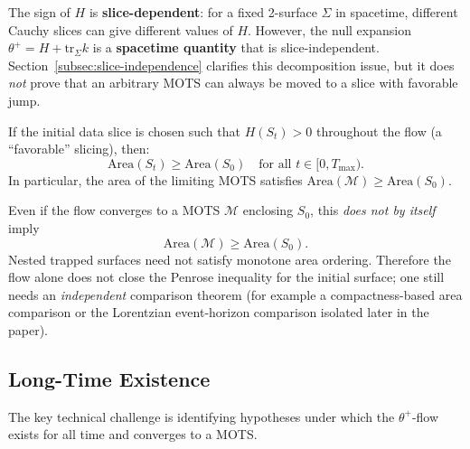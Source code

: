 \begin{remark}
\label{rem:slice-dependence}
The sign of $H$ is \textbf{slice-dependent}: for a fixed 2-surface $\Sigma$ in spacetime, different Cauchy slices can give different values of $H$. However, the null expansion $\theta^+ = H + \mathrm{tr}_\Sigma k$ is a \textbf{spacetime quantity} that is slice-independent. Section~\ref{subsec:slice-independence} clarifies this decomposition issue, but it does \emph{not} prove that an arbitrary MOTS can always be moved to a slice with favorable jump.
\end{remark}

\begin{corollary}
\label{cor:area-bound}
If the initial data slice is chosen such that $H(S_t) > 0$ throughout the flow (a ``favorable'' slicing), then:
\begin{equation}
\mathrm{Area}(S_t) \geq \mathrm{Area}(S_0) \quad \text{for all } t \in [0, T_{\max}).
\end{equation}
In particular, the area of the limiting MOTS satisfies $\mathrm{Area}(\mathcal{M}) \geq \mathrm{Area}(S_0)$.
\end{corollary}

\begin{remark}
Even if the flow converges to a MOTS $\mathcal{M}$ enclosing $S_0$, this \emph{does not by itself} imply
\[
    \mathrm{Area}(\mathcal{M}) \ge \mathrm{Area}(S_0).
\]
Nested trapped surfaces need not satisfy monotone area ordering. Therefore the flow alone does not close the Penrose inequality for the initial surface; one still needs an \emph{independent} comparison theorem (for example a compactness-based area comparison or the Lorentzian event-horizon comparison isolated later in the paper).
\end{remark}

\subsection{Long-Time Existence}
\label{subsec:longtime-existence}

The key technical challenge is identifying hypotheses under which the $\theta^+$-flow exists for all time and converges to a MOTS.

